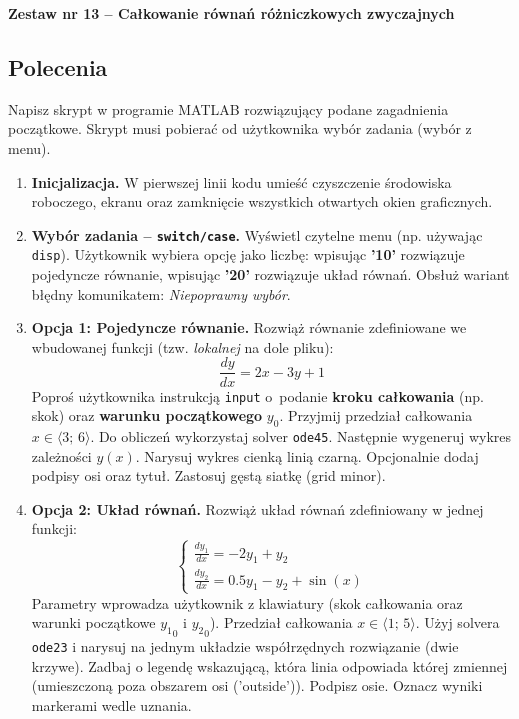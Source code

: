 \documentclass[a4paper,11pt]{article}
\begin{document}
\clearpage
\begin{center}
  {\large\bfseries Zestaw nr 13 \quad -- \quad Całkowanie równań różniczkowych zwyczajnych}
\end{center}
\hrulefill
\vspace{0.4cm}

\subsection*{Polecenia}

Napisz skrypt w programie MATLAB rozwiązujący podane zagadnienia początkowe. Skrypt musi pobierać od użytkownika wybór zadania (wybór z menu).

\begin{enumerate}[leftmargin=*, label=\textbf{\arabic*.}, itemsep=2pt]

  \item \textbf{Inicjalizacja.}
    W pierwszej linii kodu umieść czyszczenie środowiska roboczego, ekranu oraz zamknięcie wszystkich otwartych okien graficznych.

  \item \textbf{Wybór zadania -- \texttt{switch/case}.}
    Wyświetl czytelne menu (np. używając \texttt{disp}). Użytkownik wybiera opcję jako liczbę: wpisując \textbf{'10'} rozwiązuje pojedyncze równanie, wpisując \textbf{'20'} rozwiązuje układ równań. Obsłuż wariant błędny komunikatem: \textit{Niepoprawny wybór}.

  \item \textbf{Opcja 1: Pojedyncze równanie.}
    Rozwiąż równanie zdefiniowane we wbudowanej funkcji (tzw. \textit{lokalnej} na dole pliku):
    \[ \frac{dy}{dx} = 2x - 3y + 1 \]
    Poproś użytkownika instrukcją \texttt{input} o~podanie \textbf{kroku całkowania} (np. skok) oraz \textbf{warunku początkowego} $y_0$. Przyjmij przedział całkowania $x \in \langle 3;\,6 \rangle$.
    Do obliczeń wykorzystaj solver \texttt{ode45}. Następnie wygeneruj wykres zależności $y(x)$. Narysuj wykres cienką linią czarną. Opcjonalnie dodaj podpisy osi oraz tytuł. Zastosuj gęstą siatkę (grid minor).

  \item \textbf{Opcja 2: Układ równań.}
    Rozwiąż układ równań zdefiniowany w jednej funkcji:\\[-0.5em]
    \[
    \begin{cases}
      \frac{dy_1}{dx} = -2y_1 + y_2 \\
      \frac{dy_2}{dx} = 0.5y_1 - y_2 + \sin(x)
    \end{cases}
    \]
    Parametry wprowadza użytkownik z klawiatury (skok całkowania oraz warunki początkowe $ {y_1}_{0} $ i $ {y_2}_{0} $). Przedział całkowania $x \in \langle 1;\,5 \rangle$.
    Użyj solvera \texttt{ode23} i narysuj na jednym układzie współrzędnych rozwiązanie (dwie krzywe). Zadbaj o legendę wskazującą, która linia odpowiada której zmiennej (umieszczoną poza obszarem osi ('outside')). Podpisz osie. Oznacz wyniki markerami wedle uznania.

\end{enumerate}
\end{document}
